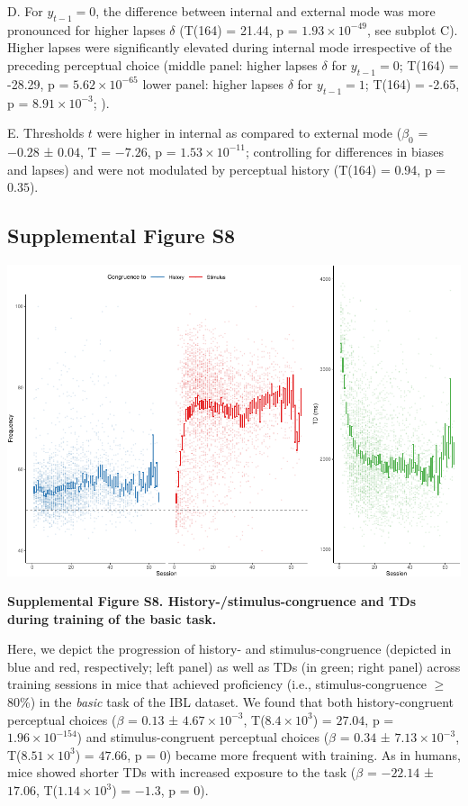 \documentclass[
]{article}
\begin{document}
D. For \(y_{t-1} = 0\), the difference between internal and external
mode was more pronounced for higher lapses \(\delta\) (T(164) = 21.44, p
= \(\ensuremath{1.93\times 10^{-49}}\), see subplot C). Higher lapses
were significantly elevated during internal mode irrespective of the
preceding perceptual choice (middle panel: higher lapses \(\delta\) for
\(y_{t-1} = 0\); T(164) = -28.29, p =
\(\ensuremath{5.62\times 10^{-65}}\) lower panel: higher lapses
\(\delta\) for \(y_{t-1} = 1\); T(164) = -2.65, p =
\(\ensuremath{8.91\times 10^{-3}}\); ).

E. Thresholds \(t\) were higher in internal as compared to external mode
(\(\beta_0\) = \(-0.28\) ± \(0.04\), T = \(-7.26\), p =
\(\ensuremath{1.53\times 10^{-11}}\); controlling for differences in
biases and lapses) and were not modulated by perceptual history (T(164)
= 0.94, p = \(0.35\)).

\newpage

\hypertarget{supplemental-figure-s8}{%
\subsection{Supplemental Figure S8}\label{supplemental-figure-s8}}

\includegraphics{modes_mouse_rev2_files/figure-latex/Supplemental_Figure_S8-1.pdf}

\textbf{Supplemental Figure S8. History-/stimulus-congruence and TDs
during training of the basic task.}

Here, we depict the progression of history- and stimulus-congruence
(depicted in blue and red, respectively; left panel) as well as TDs (in
green; right panel) across training sessions in mice that achieved
proficiency (i.e., stimulus-congruence \(\geq\) 80\%) in the
\emph{basic} task of the IBL dataset. We found that both
history-congruent perceptual choices (\(\beta\) = \(0.13\) ±
\(\ensuremath{4.67\times 10^{-3}}\),
T(\(\ensuremath{8.4\times 10^{3}}\)) = \(27.04\), p =
\(\ensuremath{1.96\times 10^{-154}}\)) and stimulus-congruent perceptual
choices (\(\beta\) = \(0.34\) ± \(\ensuremath{7.13\times 10^{-3}}\),
T(\(\ensuremath{8.51\times 10^{3}}\)) = \(47.66\), p = \(0\)) became
more frequent with training. As in humans, mice showed shorter TDs with
increased exposure to the task (\(\beta\) = \(-22.14\) ± \(17.06\),
T(\(\ensuremath{1.14\times 10^{3}}\)) = \(-1.3\), p = \(0\)).
\end{document}
